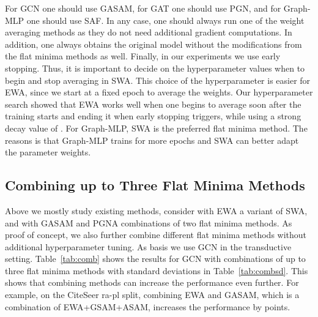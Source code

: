 \documentclass[runningheads]{llncs}
\newcommand{\GraphMLP}{Graph-MLP\xspace}
\begin{document}
For GCN one should use GASAM, for GAT one should use PGN, and for \GraphMLP one should use SAF.
In any case, one should always run one of the weight averaging methods as they do not need additional gradient computations.
In addition, one always obtains the original model without the modifications from the flat minima methods as well.
Finally, in our experiments we use early stopping.
Thus, it is important to decide on the hyperparameter values when to begin and stop averaging in SWA.
This choice of the hyperparameter is easier for EWA, since we start at a fixed epoch to average the weights.
Our hyperparameter search showed that EWA works well when one begins to average soon after the training starts and ending it when early stopping triggers, while using a strong decay value of .
For \GraphMLP, SWA is the preferred flat minima method.
The reasons is that \GraphMLP trains for more epochs and SWA can better adapt the parameter weights.


\subsection{Combining up to Three Flat Minima Methods}
Above we mostly study existing methods, consider with EWA a variant of SWA, and with GASAM and PGNA combinations of two flat minima methods.
As proof of concept, we also further combine different flat minima methods without additional hyperparameter tuning.
As basis we use GCN in the transductive setting.
Table~\ref{tab:comb} shows the results for GCN with combinations of up to three flat minima methods with standard deviations in Table~\ref{tab:combsd}.
This shows that combining methods can increase the performance even further.
For example, on the CiteSeer ra-pl split, combining EWA and GASAM, which is a combination of EWA+GSAM+ASAM, increases the performance by  points.
\end{document}
